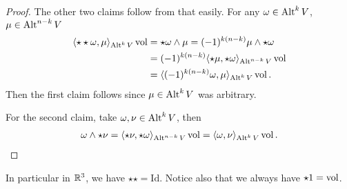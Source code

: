 \documentclass[../main.tex]{subfiles}
\begin{document}
\begin{proof}
    The other two claims follow from that easily. For any $\omega \in 
    {\text{Alt}^{k}\,V}$, $\mu \in {\text{Alt}^{n-k}\,V}$
    \begin{align*}
        \langle \star \star \omega , \mu \rangle_{{\text{Alt}^{k}\,V}}\operatorname{vol}
        &= \star \omega \wedge \mu
        = (-1)^{k(n-k)} \mu \wedge \star \omega 
        \\ &= (-1)^{k(n-k)} \langle \star \mu , \star \omega \rangle_{{\text{Alt}^{n-k}\,V}} \operatorname{vol}
        \\ &= \langle (-1)^{k(n-k)} \omega , \mu \rangle_{{\text{Alt}^{k}\,V}} \operatorname{vol}.
    \end{align*}
    Then the first claim follows since $\mu \in {\text{Alt}^{k}\,V}$ was
    arbitrary.

    For the second claim, take $\omega, \nu \in {\text{Alt}^{k}\,V}$, then
    \begin{align*}
        \omega \wedge \star \nu = \langle \star \nu , \star \omega \rangle _{{\text{Alt}^{n-k}\,V}} \operatorname{vol}
        = \langle \omega , \nu \rangle _{{\text{Alt}^{k}\,V}} \operatorname{vol}.
    \end{align*}
\end{proof}
In particular in $\mathbb{R}^3$, we have 
$\star\star = \text{Id}$. Notice also 
that we always have $\star 1 = \operatorname{vol}$.
\end{document}

